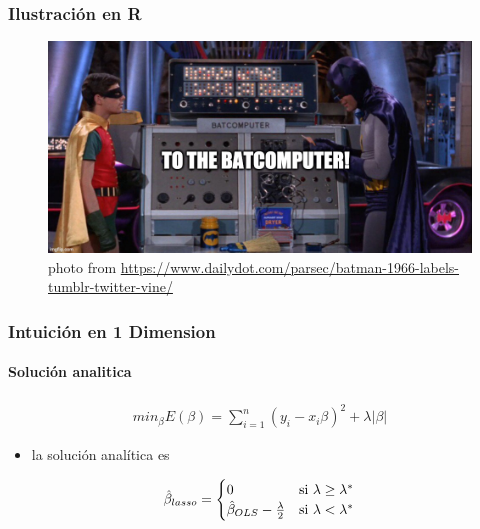 \documentclass[
  shownotes,
  xcolor={svgnames},
  hyperref={colorlinks,citecolor=DarkBlue,linkcolor=andesred,urlcolor=DarkBlue}
  , aspectratio=169]{beamer}
\begin{document}
\begin{frame}[fragile]
\frametitle{Ilustración en R}
\begin{figure}[H] \centering
  \centering
  \includegraphics[scale=0.35]{figures/baticomputer_meme.jpg}
  \\
  \tiny photo from \url{https://www.dailydot.com/parsec/batman-1966-labels-tumblr-twitter-vine/}
\end{figure}

 \end{frame}
\begin{frame}[fragile, t]
\frametitle{Intuición en 1 Dimension}
\framesubtitle{Solución analitica}

\begin{align}
min_{\beta} E(\beta) = \sum_{i=1}^n (y_i-x_i \beta)^2 + \lambda|\beta| 
\end{align}
\pause
\begin{itemize}
\item la solución analítica es 
\end{itemize}

\medskip
\begin{align}
\hat{\beta}_{lasso}=\begin{cases}
0 & \text{\text{si} }\ensuremath{\lambda\geq \lambda^*}\\
\hat{\beta}_{OLS}-\frac{\lambda}{2} & \text{\text{si} }\ensuremath{\lambda<\lambda^*}
\end{cases}
\end{align}


\end{frame}
\end{document}
